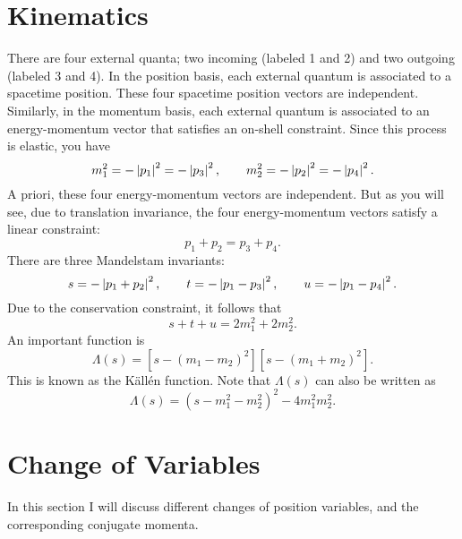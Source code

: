 \section{Kinematics}
There are four external quanta; two incoming (labeled 1 and 2) and two outgoing (labeled 3 and 4). In the position basis, each external quantum is associated to a spacetime position. These four spacetime position vectors are independent. Similarly, in the momentum basis, each external quantum is associated to an energy-momentum vector that satisfies an on-shell constraint. Since this process is elastic, you have
\begin{equation}
	m_{1}^{2} = -\left\lvert p_{1} \right\rvert^{2} = -\left\lvert p_{3} \right\rvert^{2}, \qquad m_{2}^{2} = -\left\lvert p_{2} \right\rvert^{2} = -\left\lvert p_{4} \right\rvert^{2}.
\end{equation}
A priori, these four energy-momentum vectors are independent. But as you will see, due to translation invariance, the four energy-momentum vectors satisfy a linear constraint:
\begin{equation}
	p_{1} + p_{2} = p_{3} + p_{4}.
\end{equation}
There are three Mandelstam invariants:
\begin{equation}
	s = -\left\lvert p_{1} + p_{2} \right\rvert^{2}, \qquad t = -\left\lvert p_{1} - p_{3} \right\rvert^{2}, \qquad u = -\left\lvert p_{1} - p_{4} \right\rvert^{2}.
\end{equation}
Due to the conservation constraint, it follows that
\begin{equation}
	s + t + u = 2 m_{1}^{2} + 2 m_{2}^{2}.
\end{equation}
An important function is
\begin{equation}
	\Lambda(s) = [s - (m_{1} - m_{2})^{2}] [s - (m_{1} + m_{2})^{2}].
\end{equation}
This is known as the K\"{a}ll\'{e}n function. Note that $\Lambda(s)$ can also be written as
\begin{equation}
	\Lambda(s) = (s - m_{1}^{2} - m_{2}^{2})^{2} - 4 m_{1}^{2} m_{2}^{2}.
\end{equation}
\section{Change of Variables}
In this section I will discuss different changes of position variables, and the corresponding conjugate momenta.
